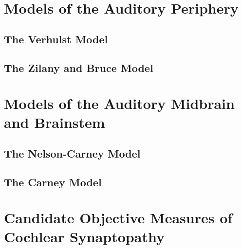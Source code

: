 \section{Models of the Auditory Periphery} %
\label{sec:models_of_the_auditory_periphery}
\subsection{The Verhulst Model} %
\label{sub:the_verhulst_model}
\subsection{The Zilany and Bruce Model} %
\label{sub:the_zilany_and_bruce_model}

\section{Models of the Auditory Midbrain and Brainstem} %
\label{sec:models_of_the_auditory_midbrain_and_brainstem}
\subsection{The Nelson-Carney Model} %
\label{sub:the_nelson_carney_model}


\subsection{The Carney Model} %
\label{sub:the_carney_model}




\section{Candidate Objective Measures of Cochlear Synaptopathy} %
\label{sec:objective_measures_of_cochlear_synaptopathy}

